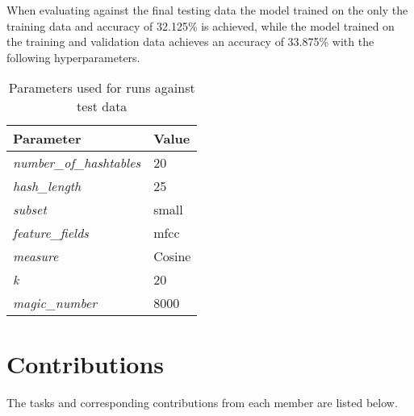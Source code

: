 \documentclass[11pt]{article}
\begin{document}
When evaluating against the final testing data the model trained on the only the training data and accuracy of 32.125\% is achieved, while the model trained on the training and validation data achieves an accuracy of 33.875\% with the following hyperparameters.

\begin{table*}[h]
\begin{center}

\begin{tabular}{|l|l|}
\hline
\textbf{Parameter}              &         \textbf{Value}                  \\ \hline
\textit{number\_of\_hashtables} & 20                         \\ \hline
\textit{hash\_length}           & 25                                                              \\ \hline
\textit{subset}        & small                   \\ \hline
\textit{feature\_fields}        & mfcc                 \\ \hline
\textit{measure}                & Cosine \\ \hline
\textit{k}                      & 20                                                 \\ \hline
\textit{magic\_number} &    8000 \\ \hline
\end{tabular}%

\caption{Parameters used for runs against test data}
\end{center}
\end{table*}

\section*{Contributions}

The tasks and corresponding contributions from each member are listed below.
\end{document}
